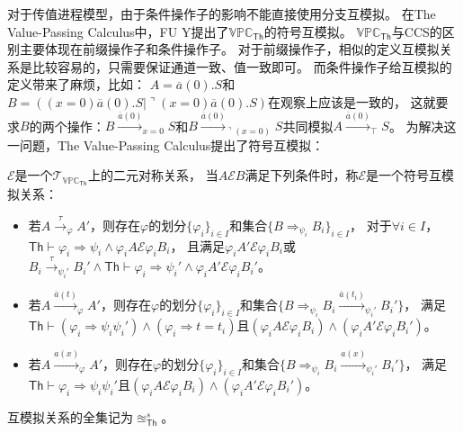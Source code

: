    对于传值进程模型，由于条件操作子的影响不能直接使用分支互模拟。
   在The Value-Passing Calculus中，FU Y提出了$\mathbb{VPC}_\mathsf{Th}$的符号互模拟。
   $\mathbb{VPC}_{\mathsf{Th}}$与CCS的区别主要体现在前缀操作子和条件操作子。
   对于前缀操作子，相似的定义互模拟关系是比较容易的，只需要保证通道一致、值一致即可。
   而条件操作子给互模拟的定义带来了麻烦，比如：
   $A=\overline{a}(0).S$和$B=((x=0) \overline{a}(0).S|\urcorner (x=0) \overline{a}(0).S)$在观察上应该是一致的，
   这就要求$B$的两个操作：$B\stackrel{\overline{a}(0)}{\longrightarrow}_{x=0} S$和$B\stackrel{\overline{a}(0)}{\longrightarrow}_{\urcorner (x=0)} S$共同模拟$A\stackrel{\overline{a}(0)}{\longrightarrow}_{\top} S$。
   为解决这一问题，The Value-Passing Calculus提出了符号互模拟：
   \begin{definition}[符号互模拟]\label{def:symbolic_bisimulation}
      $\mathcal{E}$是一个$\mathcal{T}_{\mathbb{VPC}_{\mathsf{Th}}}$上的二元对称关系，
      当$A\mathcal{E}B$满足下列条件时，称$\mathcal{E}$是一个符号互模拟关系：
      \begin{itemize}
         \item {
            若$A\stackrel{\tau}{\rightarrow}_{\varphi} A'$，则存在$\varphi$的划分$\{\varphi_i\}_{i\in I}$和集合$\{B\Rightarrow_{\psi_i} B_i\}_{i\in I}$，
            对于$\forall i\in I$，$\mathsf{Th}\vdash \varphi_i\Rightarrow \psi_i\wedge \varphi_i A\mathcal{E} \varphi_i B_i$，
            且满足$\varphi_i A'\mathcal{E} \varphi_i B_i$或$B_i\stackrel{\tau}{\rightarrow}_{\psi_i'}B_i'\wedge \mathsf{Th}\vdash \varphi_i\Rightarrow \psi_i'\wedge \varphi_i A'\mathcal{E} \varphi_i B_i'$。
         }
         \item {
            若$A\stackrel{\overline{a}(t)}{\rightarrow}_{\varphi} A'$，则存在$\varphi$的划分$\{\varphi_i\}_{i\in I}$和集合$\{B\Rightarrow_{\psi_i}B_i\stackrel{\overline{a}(t_i)}{\rightarrow}_{\psi_i'}B_i'\}$，
            满足$\mathsf{Th}\vdash (\varphi_i\Rightarrow \psi_i\psi_i')\wedge (\varphi_i \Rightarrow t=t_i)$且$(\varphi_i A\mathcal{E}\varphi_i B_i)\wedge(\varphi_i A'\mathcal{E}\varphi_i B_i')$。
         }
         \item {
            若$A\stackrel{a(x)}{\rightarrow}_{\varphi} A'$，则存在$\varphi$的划分$\{\varphi_i\}_{i\in I}$和集合$\{B\Rightarrow_{\psi_i}B_i\stackrel{a(x)}{\rightarrow}_{\psi_i'}B_i'\}$，
            满足$\mathsf{Th}\vdash \varphi_i\Rightarrow \psi_i\psi_i'$且$(\varphi_i A\mathcal{E}\varphi_i B_i)\wedge(\varphi_i A'\mathcal{E}\varphi_i B_i')$。
         }
      \end{itemize}
      互模拟关系的全集记为$\approxeq_{\mathsf{Th}}^s$。
   \end{definition}

